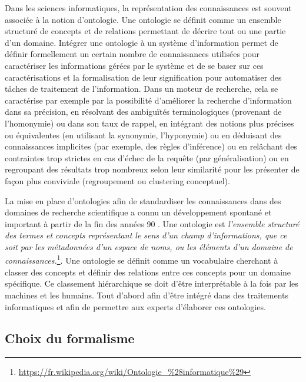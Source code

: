 Dans les sciences informatiques, la représentation des connaissances est souvent associée à la notion d'ontologie. Une ontologie se définit comme un ensemble structuré de concepts et de relations permettant de décrire tout ou une partie d'un domaine. %
Intégrer une ontologie à un système d'information permet de définir formellement un certain nombre de connaissances utilisées pour caractériser les informations gérées par le système et de se baser sur ces caractérisations et la formalisation de leur signification pour automatiser des tâches de traitement de l'information.
Dans un moteur de recherche, cela se caractérise par exemple par la possibilité d’améliorer la recherche d'information dans sa précision, en résolvant des ambiguïtés  terminologiques (provenant de l'homonymie) ou dans son taux de rappel, en intégrant des notions plus précises ou équivalentes (en utilisant la synonymie, l'hyponymie) ou en déduisant des connaissances implicites (par exemple, des règles d'inférence) ou en relâchant des contraintes trop strictes en cas d'échec de la requête (par généralisation) ou en regroupant des résultats trop nombreux selon leur similarité pour les présenter de façon plus conviviale (regroupement ou clustering conceptuel).

La mise en place d'ontologies afin de standardiser les connaissances dans des domaines de recherche scientifique a connu un développement spontané et important à partir de la fin des années 90 \cite{schulze-kremer_ontologies_2002, baker_ontology_1999}. 
Une ontologie est \textit{l'ensemble structuré des termes et concepts représentant le sens d'un champ d'informations, que ce soit par les métadonnées d'un espace de noms, ou les éléments d'un domaine de connaissances.}\footnote{\url{https://fr.wikipedia.org/wiki/Ontologie_\%28informatique\%29}}. Une ontologie se définit comme un vocabulaire cherchant à classer des concepts et définir des relations entre ces concepts pour un domaine spécifique. Ce classement hiérarchique se doit d'être interprétable à la fois par les machines et les humains. Tout d'abord afin d'être intégré dans des traitements informatiques et afin de permettre  aux experts d'élaborer ces ontologies.

\subsection{Choix du formalisme}


